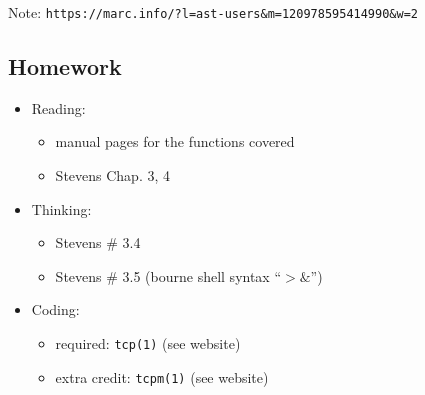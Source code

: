 \documentclass[xga]{xdvislides}
\begin{document}
Note:
{\tt https://marc.info/?l=ast-users\&m=120978595414990\&w=2}


\subsection{Homework}
\begin{itemize}
	\item Reading:
		\begin{itemize}
			\item manual pages for the functions covered
			\item Stevens Chap. 3, 4
		\end{itemize}
	\item Thinking:
		\begin{itemize}
			\item Stevens \# 3.4
			\item Stevens \# 3.5 (bourne shell syntax ``$>\&$'')
		\end{itemize}
	\item Coding:
		\begin{itemize}
			\item required: {\tt tcp(1)} (see website)
			\item extra credit: {\tt tcpm(1)} (see website)
		\end{itemize}
\end{itemize}
\end{document}
